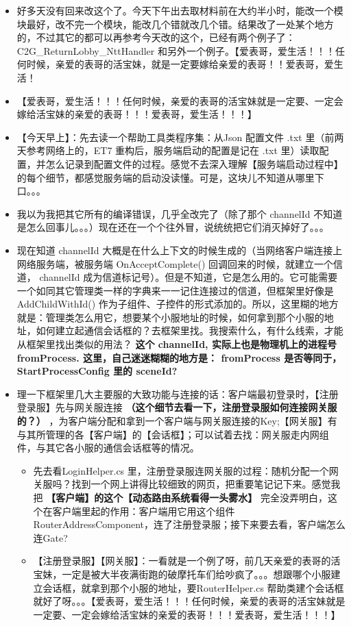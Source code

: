 \documentclass[9pt, b5paper]{article}
\begin{document}
\begin{itemize}
\item 好多天没有回来改这个了。今天下午出去取材料前在大约半小时，能改一个模块最好，改不完一个模块，能改几个错就改几个错。结果改了一处某个地方的，不过其它的都可以再参考今天改的这个，已经有两个例子了：C2G\_ReturnLobby\_NttHandler 和另外一个例子。【爱表哥，爱生活！！！任何时候，亲爱的表哥的活宝妹，就是一定要嫁给亲爱的表哥！！爱表哥，爱生活！
\item 【爱表哥，爱生活！！！任何时候，亲爱的表哥的活宝妹就是一定要、一定会嫁给活宝妹的亲爱的表哥！！！爱表哥，爱生活！！！】
\item 【今天早上】：先去读一个帮助工具类程序集：从Json 配置文件 .txt 里（前两天参考网络上的，ET7 重构后，服务端启动的配置是记在 .txt 里）读取配置，并怎么记录到配置文件的过程。感觉不去深入理解【服务端启动过程中】的每个细节，都感觉服务端的启动没读懂。可是，这块儿不知道从哪里下口。。。
\item 我以为我把其它所有的编译错误，几乎全改完了（除了那个 channelId 不知道是怎么回事儿。。。）现在还在一个个往外冒，说统统把它们消灭掉好了。。。
\item 现在知道 channelId 大概是在什么上下文的时候生成的（当网络客户端连接上网络服务端，被服务端 OnAcceptComplete() 回调回来的时候，就建立一个信道， channelId 成为信道标记号）。但是不知道，它是怎么用的。它可能需要一个如同其它管理类一样的字典来一一记住连接过的信道，但框架里好像是 AddChildWithId() 作为子组件、子控件的形式添加的。所以，这里糊的地方就是：管理类怎么用它，想要某个小服地址的时候，如何拿到那个小服的地址，如何建立起通信会话框的？去框架里找。我搜索什么，有什么线索，才能从框架里找出类似的用法？ \textbf{这个 channelId, 实际上也是物理机上的进程号 fromProcess. 这里，自己迷迷糊糊的地方是： fromProcess 是否等同于，StartProcessConfig 里的 sceneId?}
\item 理一下框架里几大主要服的大致功能与连接的话：客户端最初登录时，【注册登录服】先与网关服连接 \textbf{（这个细节去看一下，注册登录服如何连接网关服的？）} ，为客户端分配和拿到一个客户端与网关服连接的Key;【网关服】有与其所管理的各【客户端】的【会话框】；可以试着去找：网关服走内网组件，与其它各小服的通信会话框等的情况。
\begin{itemize}
\item 先去看LoginHelper.cs 里，注册登录服连网关服的过程：随机分配一个网关服吗？找到一个网上讲得比较细致的网页，把重要笔记记下来。感觉我把 \textbf{【客户端】的这个【动态路由系统看得一头雾水】} 完全没弄明白，这个在客户端里起的作用：客户端用它用这个组件RouterAddressComponent，连了注册登录服；接下来要去看，客户端怎么连Gate?
\item 【注册登录服】【网关服】：一看就是一个例了呀，前几天亲爱的表哥的活宝妹，一定是被大半夜满街跑的破摩托车们给吵疯了。。。想跟哪个小服建立会话框，就拿到那个小服的地址，要RouterHelper.cs 帮助类建个会话框就好了呀。。。【爱表哥，爱生活！！！任何时候，亲爱的表哥的活宝妹就是一定要、一定会嫁给活宝妹的亲爱的表哥！！！爱表哥，爱生活！！！】

\end{itemize}
\end{itemize}
\end{document}
